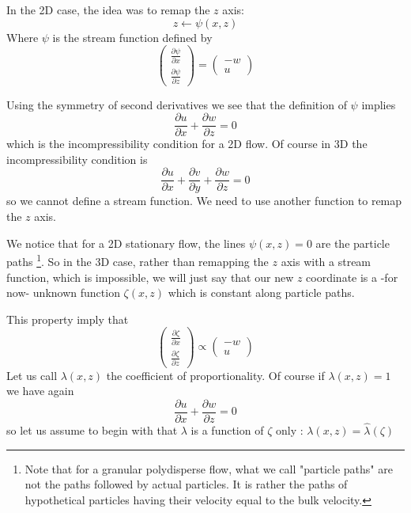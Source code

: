 \documentclass[11pt]{article}
\newcommand{\p}[2]{\ensuremath{\frac{\partial {#1}}{\partial {#2}}}}
\newcommand{\z}{\ensuremath{\zeta}}
\newcommand{\lam}{\ensuremath{\lambda}}
\begin{document}
In the 2D case, the idea was to remap the $z$ axis: 
\begin{equation}
	z \leftarrow \psi(x,z)
\end{equation}
Where $\psi$ is the stream function defined by 
\begin{equation}
	\begin{pmatrix}
	\p{\psi}{x}\\
	\p{\psi}{z} 
\end{pmatrix}
=
	\begin{pmatrix}
	-w\\
	u 
\end{pmatrix}
\end{equation}

Using the symmetry of second derivatives we see that the definition of $\psi$ implies
\begin{equation}
	\p{u}{x} + \p{w}{z} = 0
\end{equation}
which is the incompressibility condition for a 2D flow. Of course in 3D the incompressibility condition is
\begin{equation}
	\p{u}{x} + \p{v}{y} + \p{w}{z} = 0
\end{equation}
so we cannot define a stream function.
We need to use another function to remap the $z$ axis.

We notice that for a 2D stationary flow, the lines $\psi(x,z) = 0$ are the particle paths \footnote{Note that for a granular polydisperse flow, what we call "particle paths" are not the paths followed by actual particles. It is rather  the paths of hypothetical particles having their velocity equal to the bulk velocity.}.
So in the 3D case, rather than remapping the $z$ axis with a stream function, which is impossible, we will just say that our new $z$ coordinate is a -for now- unknown function $\z(x,z)$ which is constant along particle paths.

This property imply that
\begin{equation}
	\begin{pmatrix}
	\p{\z}{x}\\
	\p{\z}{z} 
\end{pmatrix}
\propto
	\begin{pmatrix}
	-w\\
	u 
\end{pmatrix}
\end{equation}
Let us call $\lam(x,z)$ the coefficient of proportionality. Of course if $\lam(x,z) = 1$ we have again
\begin{equation}
	\p{u}{x} + \p{w}{z} = 0
\end{equation}
so let us assume to begin with that $\lam$ is a function of $\zeta$ only : $\lam(x,z) = \hat{\lam}(\z)$
\end{document}

